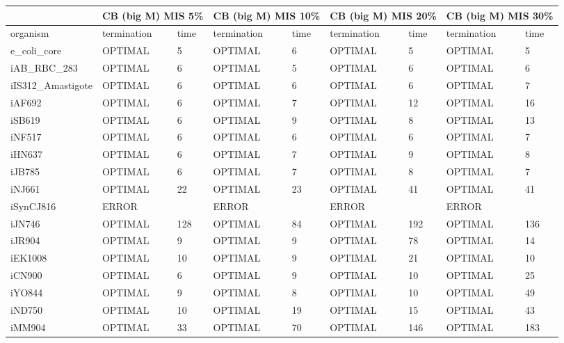 \begin{table}[!ht]
    \small
    \centering
    \begin{tabular}{|l|l|l|l|l|l|l|l|l|}
    \hline
        \multicolumn{1}{|c}{} & \multicolumn{2}{|c|}{CB (big M) MIS 5\%} & \multicolumn{2}{|c|}{CB (big M) MIS 10\%} & \multicolumn{2}{|c|}{CB (big M) MIS 20\%} & \multicolumn{2}{|c|}{CB (big M) MIS 30\%} \\ \hline
        organism & termination & time & termination & time & termination & time & termination & time \\ \hline
        e\_coli\_core & OPTIMAL & 5 & OPTIMAL & 6 & OPTIMAL & 5 & OPTIMAL & 5 \\ \hline
        iAB\_RBC\_283 & OPTIMAL & 6 & OPTIMAL & 5 & OPTIMAL & 6 & OPTIMAL & 6 \\ \hline
        iIS312\_Amastigote & OPTIMAL & 6 & OPTIMAL & 6 & OPTIMAL & 6 & OPTIMAL & 7 \\ \hline
        iAF692 & OPTIMAL & 6 & OPTIMAL & 7 & OPTIMAL & 12 & OPTIMAL & 16 \\ \hline
        iSB619 & OPTIMAL & 6 & OPTIMAL & 9 & OPTIMAL & 8 & OPTIMAL & 13 \\ \hline
        iNF517 & OPTIMAL & 6 & OPTIMAL & 6 & OPTIMAL & 6 & OPTIMAL & 7 \\ \hline
        iHN637 & OPTIMAL & 6 & OPTIMAL & 7 & OPTIMAL & 9 & OPTIMAL & 8 \\ \hline
        iJB785 & OPTIMAL & 6 & OPTIMAL & 7 & OPTIMAL & 8 & OPTIMAL & 7 \\ \hline
        iNJ661 & OPTIMAL & 22 & OPTIMAL & 23 & OPTIMAL & 41 & OPTIMAL & 41 \\ \hline
        iSynCJ816 & ERROR & ~ & ERROR & ~ & ERROR & ~ & ERROR & ~ \\ \hline
        iJN746 & OPTIMAL & 128 & OPTIMAL & 84 & OPTIMAL & 192 & OPTIMAL & 136 \\ \hline
        iJR904 & OPTIMAL & 9 & OPTIMAL & 9 & OPTIMAL & 78 & OPTIMAL & 14 \\ \hline
        iEK1008 & OPTIMAL & 10 & OPTIMAL & 9 & OPTIMAL & 21 & OPTIMAL & 10 \\ \hline
        iCN900 & OPTIMAL & 6 & OPTIMAL & 9 & OPTIMAL & 10 & OPTIMAL & 25 \\ \hline
        iYO844 & OPTIMAL & 9 & OPTIMAL & 8 & OPTIMAL & 10 & OPTIMAL & 49 \\ \hline
        iND750 & OPTIMAL & 10 & OPTIMAL & 19 & OPTIMAL & 15 & OPTIMAL & 43 \\ \hline
        iMM904 & OPTIMAL & 33 & OPTIMAL & 70 & OPTIMAL & 146 & OPTIMAL & 183 \\ \hline

\end{tabular}
\end{table}
